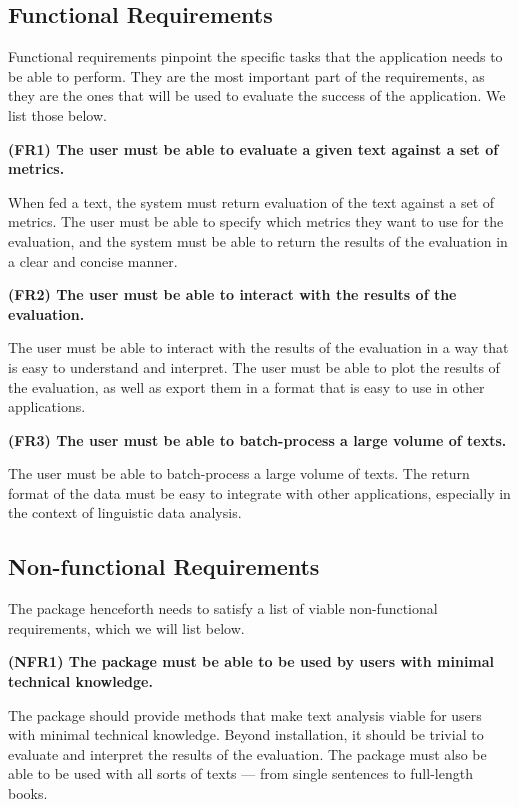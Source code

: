 \subsection{Functional Requirements}
Functional requirements pinpoint the specific tasks that the application needs to be able to perform. They are the most important part of the requirements, as they are the ones that will be used to evaluate the success of the application. We list those below.

\textbf{(FR1) The user must be able to evaluate a given text against a set of metrics.}

When fed a text, the system must return evaluation of the text against a set of metrics. The user must be able to specify which metrics they want to use for the evaluation, and the system must be able to return the results of the evaluation in a clear and concise manner.

\textbf{(FR2) The user must be able to interact with the results of the evaluation.}

The user must be able to interact with the results of the evaluation in a way that is easy to understand and interpret. The user must be able to plot the results of the evaluation, as well as export them in a format that is easy to use in other applications.

\textbf{(FR3) The user must be able to batch-process a large volume of texts.}

The user must be able to batch-process a large volume of texts. The return format of the data must be easy to integrate with other applications, especially in the context of linguistic data analysis.


\subsection{Non-functional Requirements}
The package henceforth needs to satisfy a list of viable non-functional requirements, which we will list below.

\textbf{(NFR1) The package must be able to be used by users with minimal technical knowledge.}

The package should provide methods that make text analysis viable for users with minimal technical knowledge. Beyond installation, it should be trivial to evaluate and interpret the results of the evaluation.  The package must also be able to be used with all sorts of texts --- from single sentences to full-length books.

